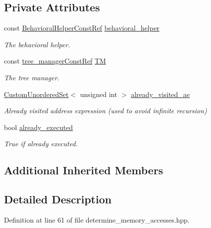 \subsection*{Private Attributes}
\begin{DoxyCompactItemize}
\item 
const \hyperlink{behavioral__helper_8hpp_aae973b54cac87eef3b27442aa3e1e425}{Behavioral\+Helper\+Const\+Ref} \hyperlink{classdetermine__memory__accesses_ab1b211e2e30260df1c147d7c3fe30240}{behavioral\+\_\+helper}
\begin{DoxyCompactList}\small\item\em The behavioral helper. \end{DoxyCompactList}\item 
const \hyperlink{tree__manager_8hpp_a792e3f1f892d7d997a8d8a4a12e39346}{tree\+\_\+manager\+Const\+Ref} \hyperlink{classdetermine__memory__accesses_a6dc11035d8da329f4f6e8008e1f36e06}{TM}
\begin{DoxyCompactList}\small\item\em The tree manager. \end{DoxyCompactList}\item 
\hyperlink{classCustomUnorderedSet}{Custom\+Unordered\+Set}$<$ unsigned int $>$ \hyperlink{classdetermine__memory__accesses_a521b58bdb10fe63f37a04982c526096b}{already\+\_\+visited\+\_\+ae}
\begin{DoxyCompactList}\small\item\em Already visited address expression (used to avoid infinite recursion) \end{DoxyCompactList}\item 
bool \hyperlink{classdetermine__memory__accesses_a0f7480b9ae00c5876ac48e7d073b2c05}{already\+\_\+executed}
\begin{DoxyCompactList}\small\item\em True if already executed. \end{DoxyCompactList}\end{DoxyCompactItemize}
\subsection*{Additional Inherited Members}


\subsection{Detailed Description}


Definition at line 61 of file determine\+\_\+memory\+\_\+accesses.\+hpp.



